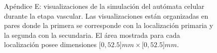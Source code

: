 \begin{figure}[!ht]
\begin{center}
\vspace*{-0.2cm}
\end{center}\vspace*{-0.6cm}
\caption[Ap\'endice E: visualizaciones de la simulaci\'on del aut\'omata celular durante la etapa vascular]{Ap\'endice E: visualizaciones de la simulaci\'on del aut\'omata celular durante la etapa vascular. Las visualizaciones est\'an organizadas en pares donde la primera se corresponde con la localizaci\'on primaria y la segunda con la secundaria. El \'area mostrada para cada localizaci\'on posee dimensiones $[0,52$.$5]mm \times [0,52$.$5]mm$.}
\end{figure}